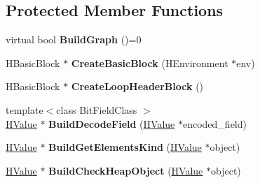 \subsection*{Protected Member Functions}
\begin{DoxyCompactItemize}
\item 
\hypertarget{classv8_1_1internal_1_1_h_graph_builder_aa19a143d4cb7c32470dbbdcba779e4fa}{}virtual bool {\bfseries Build\+Graph} ()=0\label{classv8_1_1internal_1_1_h_graph_builder_aa19a143d4cb7c32470dbbdcba779e4fa}

\item 
\hypertarget{classv8_1_1internal_1_1_h_graph_builder_a8f6a5e6dd76ebb1fdd185a397d1fbc9c}{}H\+Basic\+Block $\ast$ {\bfseries Create\+Basic\+Block} (H\+Environment $\ast$env)\label{classv8_1_1internal_1_1_h_graph_builder_a8f6a5e6dd76ebb1fdd185a397d1fbc9c}

\item 
\hypertarget{classv8_1_1internal_1_1_h_graph_builder_ab71ffdb40e1b709eb46fc952b68031b9}{}H\+Basic\+Block $\ast$ {\bfseries Create\+Loop\+Header\+Block} ()\label{classv8_1_1internal_1_1_h_graph_builder_ab71ffdb40e1b709eb46fc952b68031b9}

\item 
\hypertarget{classv8_1_1internal_1_1_h_graph_builder_a764d9af5f3d100ed14c397660b6b0735}{}{\footnotesize template$<$class Bit\+Field\+Class $>$ }\\\hyperlink{classv8_1_1internal_1_1_h_value}{H\+Value} $\ast$ {\bfseries Build\+Decode\+Field} (\hyperlink{classv8_1_1internal_1_1_h_value}{H\+Value} $\ast$encoded\+\_\+field)\label{classv8_1_1internal_1_1_h_graph_builder_a764d9af5f3d100ed14c397660b6b0735}

\item 
\hypertarget{classv8_1_1internal_1_1_h_graph_builder_a03c19286a098c5ce55a1877a09b3d5dc}{}\hyperlink{classv8_1_1internal_1_1_h_value}{H\+Value} $\ast$ {\bfseries Build\+Get\+Elements\+Kind} (\hyperlink{classv8_1_1internal_1_1_h_value}{H\+Value} $\ast$object)\label{classv8_1_1internal_1_1_h_graph_builder_a03c19286a098c5ce55a1877a09b3d5dc}

\item 
\hypertarget{classv8_1_1internal_1_1_h_graph_builder_a15cf43bf23ceecd5691159b05e6cbfab}{}\hyperlink{classv8_1_1internal_1_1_h_value}{H\+Value} $\ast$ {\bfseries Build\+Check\+Heap\+Object} (\hyperlink{classv8_1_1internal_1_1_h_value}{H\+Value} $\ast$object)\label{classv8_1_1internal_1_1_h_graph_builder_a15cf43bf23ceecd5691159b05e6cbfab}


\end{DoxyCompactItemize}
